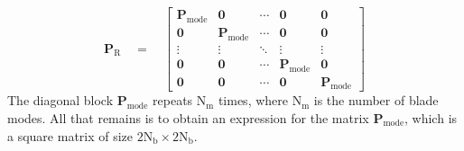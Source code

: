 \[ \textbf{P}_\textrm{R} \quad = \quad \begin{bmatrix}
\textbf{P}_\textrm{mode} & \textbf{0} & \cdots & \textbf{0} & \textbf{0} \\
\textbf{0} & \textbf{P}_\textrm{mode}  & \cdots & \textbf{0} & \textbf{0} \\
\vdots & \vdots & \ddots & \vdots & \vdots \\
\textbf{0}& \textbf{0} & \cdots  & \textbf{P}_\textrm{mode}  & \textbf{0} \\
\textbf{0} & \textbf{0} & \cdots & \textbf{0} & \textbf{P}_\textrm{mode} 
\end{bmatrix} \]
The diagonal block \textbf{P}$_\textrm{mode}$ repeats N$_\textrm{m}$ times, where N$_\textrm{m}$ is the number of blade modes. All that remains is to obtain an expression for the matrix \textbf{P}$_\textrm{mode}$, which is a square matrix of size $2\textrm{N}_\textrm{b} \times 2\textrm{N}_\textrm{b}$. 

